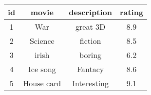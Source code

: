 \begin{tabular}{|c|c|c|c|}
    \hline
        \textbf{id} & \textbf{movie} & \textbf{description} & \textbf{rating} \\ \hline
        1 & War & great 3D & 8.9 \\ 
        2 & Science & fiction & 8.5 \\ 
        3 & irish & boring & 6.2 \\ 
        4 & Ice song & Fantacy & 8.6 \\ 
        5 & House card & Interesting & 9.1 \\ \hline
\end{tabular}
